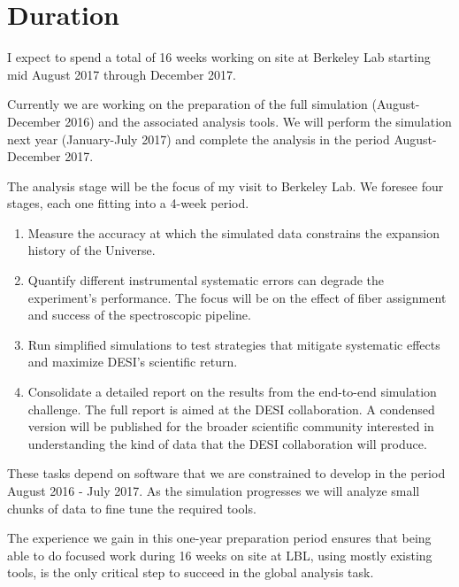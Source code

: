 \documentclass[12pt]{article}
\begin{document}
\section*{Duration}

I expect to spend a total of 16 weeks working on site at Berkeley
Lab starting mid August 2017 through December 2017. 

Currently we are working on the preparation of the full simulation
(August-December 2016) and the associated analysis tools. We will
perform the simulation next year (January-July 2017) and complete the
analysis in the period August-December 2017.  

The analysis stage will be the focus of my visit
to Berkeley Lab.
We foresee four stages, each one fitting into a 4-week period.

\begin{enumerate}
\item Measure the accuracy at which the simulated data constrains the
  expansion history of the Universe.  
\item Quantify different instrumental systematic errors can degrade
  the experiment's performance. The focus will be on the effect of
  fiber assignment and success of the spectroscopic pipeline. 
\item Run simplified simulations to test strategies that mitigate
  systematic effects and maximize DESI's scientific return.
\item Consolidate a detailed report on the results from the end-to-end
  simulation challenge. 
  The full report is aimed at the DESI collaboration. A condensed
  version will be published for the broader scientific community
  interested in understanding the kind of data that the DESI
  collaboration will produce. 
\end{enumerate}

These tasks depend on software that we are constrained to develop in
the period August 2016 - July 2017. As the simulation progresses we
will analyze small chunks of data to fine tune the required tools.  

The experience we gain in this one-year preparation period ensures that
being able to do focused work during 16 weeks on site at LBL, using
mostly existing tools, is the only critical step to succeed in the
global analysis task. 
\end{document}
